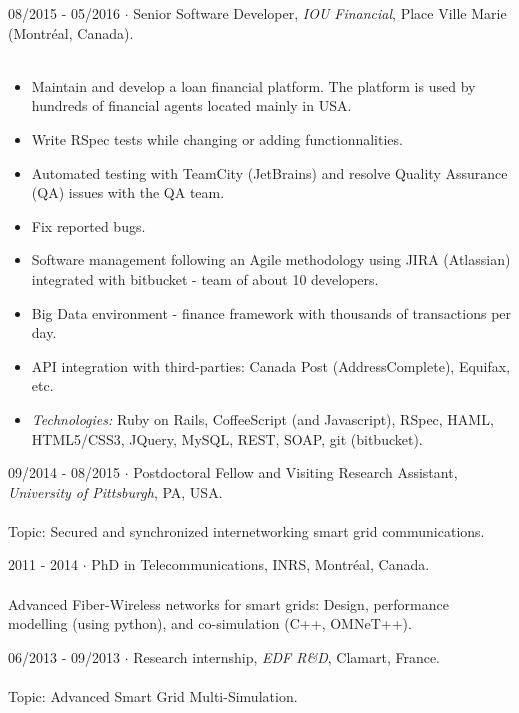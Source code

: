 \documentclass{cv}
\begin{document}
\begin{formation}
   \item[08/2015 - 05/2016]
     $\cdot$ Senior Software Developer, \textit{IOU Financial}, Place Ville Marie (Montr\'eal, Canada). \\ ~\\
     \begin{itemize}
     \item Maintain and develop a loan financial platform. The platform is used by hundreds of financial agents located mainly in USA.
     \item Write RSpec tests while changing or adding functionnalities.
     \item Automated testing with TeamCity (JetBrains) and resolve Quality Assurance (QA) issues with the QA team.
     \item Fix reported bugs.
     \item Software management following an Agile methodology using JIRA (Atlassian) integrated with bitbucket - team of about 10 developers.
     \item Big Data environment - finance framework with thousands of transactions per day.
     \item API integration with third-parties: Canada Post (AddressComplete), Equifax, etc.
     \item \textit{Technologies:} Ruby on Rails, CoffeeScript (and Javascript), RSpec, HAML, HTML5/CSS3, JQuery, MySQL, REST, SOAP, git (bitbucket).
     \end{itemize}\normalsize 

   \item[09/2014 - 08/2015]
     $\cdot$ Postdoctoral Fellow and Visiting Research Assistant, \textit{University of Pittsburgh}, PA, USA. \\ ~\\\small
     Topic: Secured and synchronized internetworking smart grid communications.\normalsize



	\item[2011 - 2014]
     $\cdot$ PhD in Telecommunications, INRS, Montr\'eal, Canada. \\ ~\\
     \small Advanced Fiber-Wireless networks for smart grids: Design, performance modelling (using python), and co-simulation (C++, OMNeT++).  \normalsize   
     
   \item[06/2013 - 09/2013]
     $\cdot$ Research internship, \textit{EDF R\&D}, Clamart, France. \\ ~\\
     \small Topic: Advanced Smart Grid Multi-Simulation. \normalsize
     

\end{formation}
\end{document}
